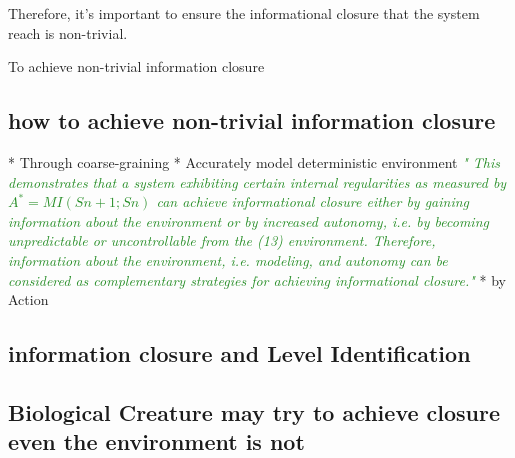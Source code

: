 \documentclass[utf8]{article}
\newcommand{\rewrite}[1]{\textcolor{ForestGreen}{\textit{"#1"}}\newline}
\begin{document}
		Therefore, it's important to ensure the informational closure that the system reach is non-trivial.
		
		To achieve non-trivial information closure
		\citep{BERTSCHINGER.2006}\\
		\citep{guttenberg2016neural}
		
		
		
		
		\subsection{how to achieve non-trivial information closure}
		* Through coarse-graining
		* Accurately model deterministic environment 
		\rewrite{
			This demonstrates that a system exhibiting certain internal regularities as measured by $A^* = MI(Sn+1; Sn)$ can achieve informational closure either by gaining information about the environment or by increased autonomy, i.e. by becoming unpredictable or uncontrollable from the (13) environment. Therefore, information about the environment, i.e. modeling, and autonomy can be considered as complementary strategies for achieving informational closure.}
		* by Action 
		
		\subsection{information closure and Level Identification}	
		
		
		\subsection{Biological Creature may try to achieve closure even the environment is not }
\end{document}
